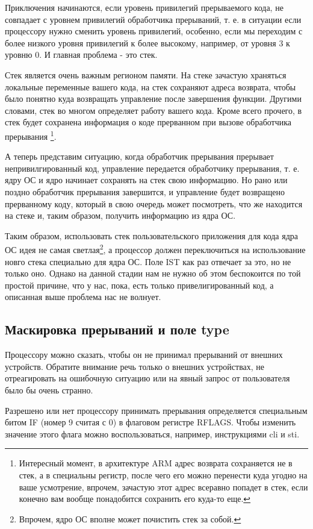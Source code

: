 Приключения начинаются, если уровень привилегий прерываемого кода, не совпадает
с уровнем привилегий обработчика прерываний, т. е. в ситуации если процессору
нужно сменить уровень привилегий, особенно, если мы переходим с более низкого
уровня привилегий к более высокому, например, от уровня 3 к уровню 0. И главная
проблема - это стек.

Стек является очень важным регионом памяти. На стеке зачастую храняться
локальные переменные вашего кода, на стек сохраняют адреса возврата, чтобы было
понятно куда возвращать управление после завершения функции. Другими словами,
стек во многом определяет работу вашего кода. Кроме всего прочего, в стек будет
сохранена информация о коде прерванном при вызове обработчика прерывания
\footnote{Интересный момент, в архитектуре ARM адрес возврата сохраняется не
в стек, а в специальны регистр, после чего его можно перенести куда угодно на
ваше усмотрение, впрочем, зачастую этот адрес всеравно попадет в стек, если
конечно вам вообще понадобится сохранить его куда-то еще.}.

А теперь представим ситуацию, когда обработчик прерывания прерывает
непривилгированный код, управление передается обработчику прерывания, т. е.
ядру ОС и ядро начинает сохранять на стек свою информацию. Но рано или поздно
обработчик прерывания завершится, и управление будет возвращено прерванному
коду, который в свою очередь может посмотреть, что же находится на стеке и,
таким образом, получить информацию из ядра ОС.

Таким образом, использовать стек пользовательского приложения для кода ядра ОС
идея не самая светлая\footnote{Впрочем, ядро ОС вполне может почистить стек за
собой.}, а процессор должен переключиться на использование новго стека
специально для ядра ОС. Поле IST как раз отвечает за это, но не только оно.
Однако на данной стадии нам не нужно об этом беспокоится по той простой причине,
что у нас, пока, есть только привелигированный код, а описанная выше проблема
нас не волнует.

\subsection{Маскировка прерываний и поле type}

Процессору можно сказать, чтобы он не принимал прерываний от внешних устройств.
Обратите внимание речь только о внешних устройствах, не отреагировать на
ошибочную ситуацию или на явный запрос от пользователя было бы очень странно.

Разрешено или нет процессору принимать прерывания определяется специальным битом
IF (номер 9 считая с 0) в флаговом регистре RFLAGS. Чтобы изменить значение
этого флага можно воспользоваться, например, инструкциями cli и sti.

